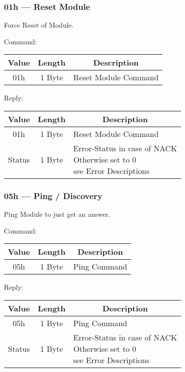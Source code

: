 \subsubsection{01h --- Reset Module}
Force Reset of Module. 

Command:
\begin{table}[H]
    \centering
    \begin{tabular}{|c|c|l|}
        \hline
        \textbf{Value}   &   \textbf{Length} & \multicolumn{1}{|c|}{\textbf{Description}}\\ \hline \hline
        01h   &  1 Byte & Reset Module Command \\ \hline
    \end{tabular}
\label{tab:CAN-01-C}
\end{table}
Reply:
\begin{table}[H]
    \centering
    \begin{tabular}{|c|c|l|}
        \hline
        \textbf{Value}   &   \textbf{Length} & \multicolumn{1}{|c|}{\textbf{Description}}\\ \hline \hline
        01h   &  1 Byte & Reset Module Command \\ \hline
        Status & 1 Byte & \makecell[l]{Error-Status in case of NACK \\ Otherwise set to 0\\see Error Descriptions}\\ \hline
    \end{tabular}
\label{tab:CAN-01-R}
\end{table}

\subsubsection{05h --- Ping / Discovery}
Ping Module to just get an answer. 

Command:
\begin{table}[H]
    \centering
    \begin{tabular}{|c|c|l|}
        \hline
        \textbf{Value}   &   \textbf{Length} & \multicolumn{1}{|c|}{\textbf{Description}}\\ \hline \hline
        05h   &  1 Byte & Ping Command \\ \hline
    \end{tabular}
\label{tab:CAN-05-C}
\end{table}
Reply:
\begin{table}[H]
    \centering
    \begin{tabular}{|c|c|l|}
        \hline
        \textbf{Value}   &   \textbf{Length} & \multicolumn{1}{|c|}{\textbf{Description}}\\ \hline \hline
        05h   &  1 Byte & Ping Command \\ \hline
        Status & 1 Byte & \makecell[l]{Error-Status in case of NACK \\ Otherwise set to 0\\see Error Descriptions}\\ \hline
    \end{tabular}
\label{tab:CAN-05-R}
\end{table}

